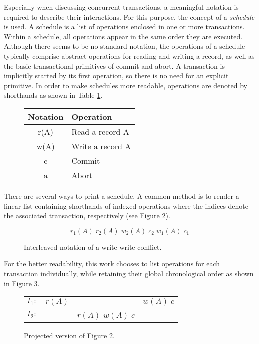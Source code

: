 Especially when discussing concurrent transactions, a meaningful notation is
required to describe their interactions. For this purpose, the concept of a
\emph{schedule} is used. A schedule is a list of operations enclosed in one or
more transactions. Within a schedule, all operations appear in the same order
they are executed. Although there seems to be no standard notation, the
operations of a schedule typically comprise abstract operations for reading and
writing a record, as well as the basic transactional primitives of commit and
abort. A transaction is implicitly started by its first operation, so there is
no need for an explicit primitive. In order to make schedules more readable,
operations are denoted by shorthands as shown in Table
\ref{tab:schedule_notation}.

\begin{figure}[h!]
    \centering
    \begin{tabular}{|c|l|}
        \hline
        \textbf{Notation} & \textbf{Operation}\\
        \hline
        r(A) & Read a record A  \\ \hline
        w(A) & Write a record A \\ \hline
        c    & Commit           \\ \hline
        a    & Abort            \\
        \hline
    \end{tabular}
    \caption{}
    \label{tab:schedule_notation}
\end{figure}

There are several ways to print a schedule. A common method is to render a
linear list containing shorthands of indexed operations where the indices denote
the associated transaction, respectively (see Figure
\ref{fig:schedule_interleaved}).

\begin{figure}[h!]
    \centering
    \[
        r_1(A)\; r_2(A)\; w_2(A)\; c_2\; w_1(A)\; c_1
    \]
    \caption{Interleaved notation of a write-write conflict.}
    \label{fig:schedule_interleaved}
\end{figure}


For the better readability, this work chooses to list operations for each transaction individually, while retaining their global chronological order as shown in Figure \ref{fig:schedule_projected}.

\begin{figure}[h!]
    \centering
    \begin{tabular}{r c c c}
        $t_1:$ & $r(A)$ &                     & $w(A)\; c$ \\
        $t_2:$ &        & $r(A)$\; $w(A)\; c$ &            \\
    \end{tabular}
    \caption{Projected version of Figure \ref{fig:schedule_interleaved}.}
    \label{fig:schedule_projected}
\end{figure}

